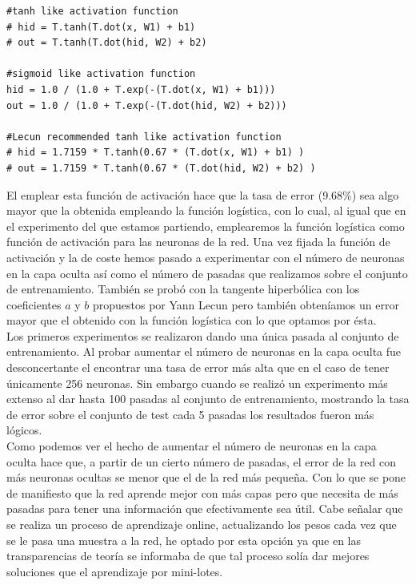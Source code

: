 \documentclass[10pt,a4paper]{article}
\begin{document}
\begin{lstlisting}
#tanh like activation function
# hid = T.tanh(T.dot(x, W1) + b1)
# out = T.tanh(T.dot(hid, W2) + b2)

#sigmoid like activation function
hid = 1.0 / (1.0 + T.exp(-(T.dot(x, W1) + b1)))
out = 1.0 / (1.0 + T.exp(-(T.dot(hid, W2) + b2)))

#Lecun recommended tanh like activation function
# hid = 1.7159 * T.tanh(0.67 * (T.dot(x, W1) + b1) )
# out = 1.7159 * T.tanh(0.67 * (T.dot(hid, W2) + b2) )
\end{lstlisting}

El emplear esta función de activación hace que la tasa de error (9.68\%) sea algo mayor que la obtenida empleando la función logística, con lo cual, al igual que en el experimento del que estamos partiendo, emplearemos la función logística como función de activación para las neuronas de la red. Una vez fijada la función de activación y la de coste hemos pasado a experimentar con el número de neuronas en la capa oculta así como el número de pasadas que realizamos sobre el conjunto de entrenamiento. También se probó con la tangente hiperbólica con los coeficientes $a$ y $b$ propuestos por Yann Lecun pero también obteníamos un error mayor que el obtenido con la función logística con lo que optamos por ésta.\\

Los primeros experimentos se realizaron dando una única pasada al conjunto de entrenamiento. Al probar aumentar el número de neuronas en la capa oculta fue desconcertante el encontrar una tasa de error más alta que en el caso de tener únicamente 256 neuronas. Sin embargo cuando se realizó un experimento más extenso al dar hasta 100 pasadas al conjunto de entrenamiento, mostrando la tasa de error sobre el conjunto de test cada 5 pasadas los resultados fueron más lógicos.\\

Como podemos ver el hecho de aumentar el número de neuronas en la capa oculta hace que, a partir de un cierto número de pasadas, el error de la red con más neuronas ocultas se menor que el de la red más pequeña. Con lo que se pone de manifiesto que la red aprende mejor con más capas pero que necesita de más pasadas para tener una información que efectivamente sea útil. Cabe señalar que se realiza un proceso de aprendizaje online, actualizando los pesos cada vez que se le pasa una muestra a la red, he optado por esta opción ya que en las transparencias de teoría se informaba de que tal proceso solía dar mejores soluciones que el aprendizaje por mini-lotes.
\end{document}
